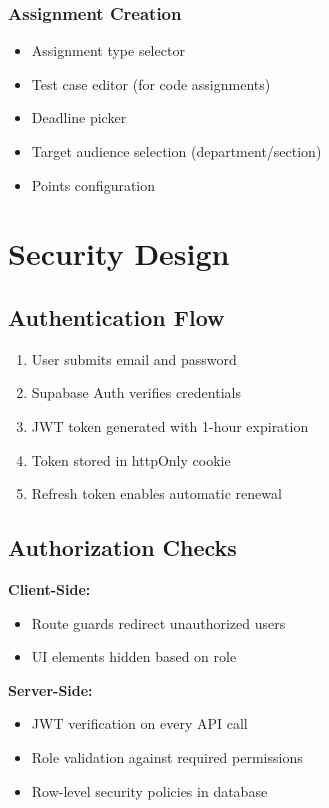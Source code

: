 \subsubsection{Assignment Creation}
\begin{itemize}
\item Assignment type selector
\item Test case editor (for code assignments)
\item Deadline picker
\item Target audience selection (department/section)
\item Points configuration
\end{itemize}

\section{Security Design}

\subsection{Authentication Flow}

\begin{enumerate}
\item User submits email and password
\item Supabase Auth verifies credentials
\item JWT token generated with 1-hour expiration
\item Token stored in httpOnly cookie
\item Refresh token enables automatic renewal
\end{enumerate}

\subsection{Authorization Checks}

\textbf{Client-Side:}
\begin{itemize}
\item Route guards redirect unauthorized users
\item UI elements hidden based on role
\end{itemize}

\textbf{Server-Side:}
\begin{itemize}
\item JWT verification on every API call
\item Role validation against required permissions
\item Row-level security policies in database
\end{itemize}


